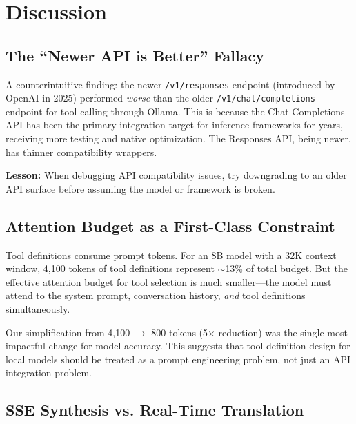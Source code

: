 \documentclass[11pt,a4paper]{article}
\begin{document}
\section{Discussion}

\subsection{The ``Newer API is Better'' Fallacy}

A counterintuitive finding: the newer \texttt{/v1/responses} endpoint
(introduced by OpenAI in 2025) performed \textit{worse} than the older
\texttt{/v1/chat/completions} endpoint for tool-calling through Ollama.
This is because the Chat Completions API has been the primary integration
target for inference frameworks for years, receiving more testing and native
optimization. The Responses API, being newer, has thinner compatibility
wrappers.

\textbf{Lesson:} When debugging API compatibility issues, try downgrading to
an older API surface before assuming the model or framework is broken.

\subsection{Attention Budget as a First-Class Constraint}

Tool definitions consume prompt tokens. For an 8B model with a 32K context
window, 4,100 tokens of tool definitions represent $\sim$13\% of total
budget. But the effective attention budget for tool selection is much
smaller---the model must attend to the system prompt, conversation history,
\textit{and} tool definitions simultaneously.

Our simplification from 4,100 $\rightarrow$ 800 tokens (5$\times$ reduction)
was the single most impactful change for model accuracy. This suggests that
tool definition design for local models should be treated as a prompt
engineering problem, not just an API integration problem.

\subsection{SSE Synthesis vs. Real-Time Translation}
\end{document}
